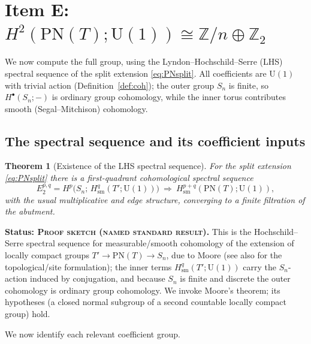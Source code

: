 \documentclass[11pt]{article}
\newtheorem{theorem}{Theorem}[section]
\theoremstyle{definition}
\newcommand{\U}{\mathrm{U}}
\newcommand{\PN}{\mathrm{PN}}
\newcommand{\Z}{\mathbb{Z}}
\newcommand{\Tp}{T'}
\newcommand{\sm}{\mathrm{sm}}
\newcommand{\STAT}[1]{\noindent\textbf{Status: #1}}
\newcommand{\SKETCH}{\textsc{Proof sketch (named standard result)}}
\begin{document}
\section{Item E: $H^2(\PN(T);\U(1))\cong\Z/n\oplus\Z_2$}\label{sec:E}

We now compute the full group, using the Lyndon--Hochschild--Serre (LHS) spectral sequence
of the split extension \eqref{eq:PNsplit}. All coefficients are $\U(1)$ with trivial action
(Definition~\ref{def:coh}); the outer group $S_n$ is finite, so $H^{\bullet}(S_n;-)$ is
ordinary group cohomology, while the inner torus contributes smooth (Segal--Mitchison)
cohomology.

\subsection{The spectral sequence and its coefficient inputs}

\begin{theorem}[Existence of the LHS spectral sequence]\label{thm:LHS}
For the split extension \eqref{eq:PNsplit} there is a first-quadrant cohomological spectral
sequence
\[
E_2^{p,q}=H^{p}\big(S_n;\,H^{q}_{\sm}(\Tp;\U(1))\big)\ \Longrightarrow\
H^{p+q}_{\sm}(\PN(T);\U(1)),
\]
with the usual multiplicative and edge structure, converging to a finite filtration of the
abutment.
\end{theorem}
\STAT{\SKETCH.} This is the Hochschild--Serre spectral sequence for measurable/smooth
cohomology of the extension of locally compact groups $\Tp\to\PN(T)\to S_n$, due to Moore
\cite[\S\S2--3]{MooreIV} (see also \cite{Lichtenbaum,Flach} for the topological/site
formulation); the inner terms $H^q_{\sm}(\Tp;\U(1))$ carry the $S_n$-action induced by
conjugation, and because $S_n$ is finite and discrete the outer cohomology is ordinary group
cohomology. We invoke Moore's theorem; its hypotheses (a closed normal subgroup of a second
countable locally compact group) hold.

We now identify each relevant coefficient group.
\end{document}
